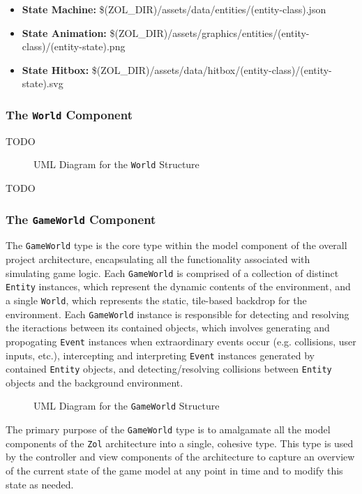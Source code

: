 \documentclass{article}
\newcommand{\classname}[1] {\texttt{#1}}
\newcommand{\projectname}[0] {\texttt{Zol} }
\newcommand{\insertdiagram}[2]
{
	\begin{figure}[H]
		\centering
		\fbox{\texttt{[image: figures/\#1]}}
		\caption{UML Diagram for the \classname{#1} Structure}
	\end{figure}
}
\begin{document}
			\begin{itemize}
				\item \textbf{State Machine:} \$(ZOL\_DIR)/assets/data/entities/(entity-class).json
				\item \textbf{State Animation:} \$(ZOL\_DIR)/assets/graphics/entities/(entity-class)/(entity-state).png
				\item \textbf{State Hitbox:} \$(ZOL\_DIR)/assets/data/hitbox/(entity-class)/(entity-state).svg
			\end{itemize}

			\subsubsection[\classname{World}]{The \classname{World} Component}
			TODO

			\insertdiagram{World}{2.0in}

			TODO

			\subsubsection[\classname{GameWorld}]{The \classname{GameWorld} Component}
			The \classname{GameWorld} type is the core type within the model 
			component of the overall project architecture, encapsulating all 
			the functionality associated with simulating game logic.  Each
			\classname{GameWorld} is comprised of a collection of distinct
			\classname{Entity} instances, which represent the dynamic contents
			of the environment, and a single \classname{World}, which represents
			the static, tile-based backdrop for the environment.  Each \classname{GameWorld} instance
			is responsible for detecting and resolving the iteractions between
			its contained objects, which involves generating and propogating 
			\classname{Event} instances when extraordinary events occur (e.g.
			collisions, user inputs, etc.), intercepting and interpreting 
			\classname{Event} instances generated by contained \classname{Entity} 
			objects, and detecting/resolving collisions between \classname{Entity} 
			objects and the background environment.

			\insertdiagram{GameWorld}{3.0in}

			The primary purpose of the \classname{GameWorld} type is to amalgamate
			all the model components of the \projectname architecture into a
			single, cohesive type.  This type is used by the controller and view
			components of the architecture to capture an overview of the current
			state of the game model at any point in time and to modify this state
			as needed.
\end{document}
